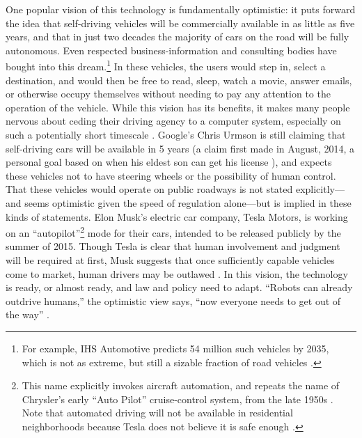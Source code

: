 
One popular vision of this technology is fundamentally optimistic: it
puts forward the
idea that self-driving vehicles will be commercially available in as little
as five years, and that in just two decades the majority of cars on the road will be
fully autonomous. Even respected business-information and consulting
bodies have bought into this dream.\footnote{For example,
  IHS Automotive
  predicts 54 million such vehicles by 2035, which is not as extreme,
  but still a sizable fraction of road vehicles \cite{IHSstudy}.} In
these vehicles, the users would 
step in, select a destination, and would then be free to read, sleep,
watch a movie, answer emails, or otherwise occupy themselves without
needing to pay any attention to the operation of the vehicle. While this
vision has its benefits, it makes many people nervous about
ceding their driving agency to a computer system, especially on such a
potentially short timescale \cite{clytton}. Google's Chris Urmson is
still claiming that self-driving cars will be available in 5 years (a
claim first made in August, 2014, a personal goal based on when his
eldest son can get his license \cite{gomesObstacles}), and expects
these vehicles not to have steering wheels or the possibility of human
control. That these vehicles would operate on public roadways is not
stated explicitly---and seems optimistic given the speed of regulation
alone---but is implied in these kinds of statements. Elon Musk's
electric car company, Tesla Motors, is working on an 
``autopilot''\footnote{This name explicitly invokes aircraft
  automation, and repeats the name of Chrysler's early ``Auto Pilot''
cruise-control system, from the late 1950s
\cite{kesslerElon}. Note that automated driving will not be available
in residential neighborhoods because Tesla does not believe it is safe
enough \cite{slashgearDaviesT}.} mode for their cars, intended to be released publicly by
the summer of 2015.
Though Tesla is clear that human involvement and judgment will be
required at first, Musk suggests 
that once sufficiently capable vehicles 
come to market, human drivers may be
outlawed \cite{kingGoogle}.
In this vision, the technology is ready, or almost ready, and law and policy need to
adapt. ``Robots can already outdrive humans,'' the optimistic view says, ``now
everyone needs to get out of the way''
\cite{fisherInside}.



